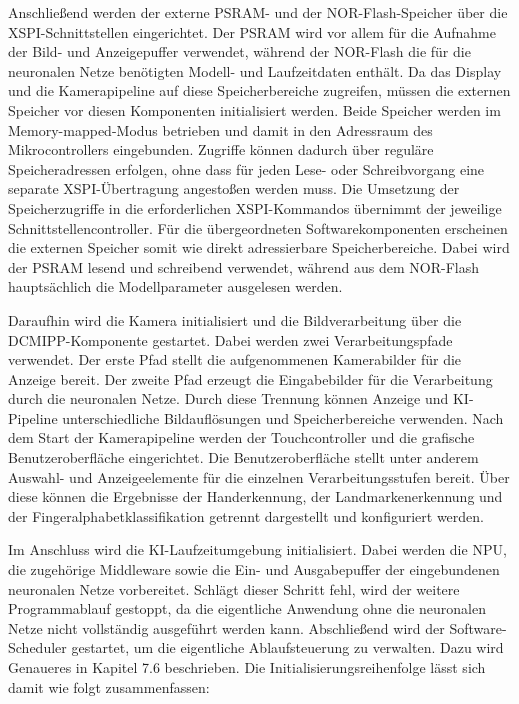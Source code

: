 Anschließend werden der externe PSRAM- und der NOR-Flash-Speicher über die XSPI-Schnittstellen eingerichtet. Der PSRAM wird vor allem für die Aufnahme der Bild- und Anzeigepuffer verwendet, während der NOR-Flash die für die neuronalen Netze benötigten Modell- und Laufzeitdaten enthält. Da das Display und die Kamerapipeline auf diese Speicherbereiche zugreifen, müssen die externen Speicher vor diesen Komponenten initialisiert werden. Beide Speicher werden im Memory-mapped-Modus betrieben und damit in den Adressraum des Mikrocontrollers eingebunden. Zugriffe können dadurch über reguläre Speicheradressen erfolgen, ohne dass für jeden Lese- oder Schreibvorgang eine separate XSPI-Übertragung angestoßen werden muss. Die Umsetzung der Speicherzugriffe in die erforderlichen XSPI-Kommandos übernimmt der jeweilige Schnittstellencontroller. Für die übergeordneten Softwarekomponenten erscheinen die externen Speicher somit wie direkt adressierbare Speicherbereiche. Dabei wird der PSRAM lesend und schreibend verwendet, während aus dem NOR-Flash hauptsächlich die Modellparameter ausgelesen werden.

Daraufhin wird die Kamera initialisiert und die Bildverarbeitung über die DCMIPP-Komponente gestartet. Dabei werden zwei Verarbeitungspfade verwendet. Der erste Pfad stellt die aufgenommenen Kamerabilder für die Anzeige bereit. Der zweite Pfad erzeugt die Eingabebilder für die Verarbeitung durch die neuronalen Netze. Durch diese Trennung können Anzeige und KI-Pipeline unterschiedliche Bildauflösungen und Speicherbereiche verwenden. Nach dem Start der Kamerapipeline werden der Touchcontroller und die grafische Benutzeroberfläche eingerichtet. Die Benutzeroberfläche stellt unter anderem Auswahl- und Anzeigeelemente für die einzelnen Verarbeitungsstufen bereit. Über diese können die Ergebnisse der Handerkennung, der Landmarkenerkennung und der Fingeralphabetklassifikation getrennt dargestellt und konfiguriert werden.

Im Anschluss wird die KI-Laufzeitumgebung initialisiert. Dabei werden die NPU, die zugehörige Middleware sowie die Ein- und Ausgabepuffer der eingebundenen neuronalen Netze vorbereitet. Schlägt dieser Schritt fehl, wird der weitere Programmablauf gestoppt, da die eigentliche Anwendung ohne die neuronalen Netze nicht vollständig ausgeführt werden kann. Abschließend wird der Software-Scheduler gestartet, um die eigentliche Ablaufsteuerung zu verwalten. Dazu wird Genaueres in Kapitel 7.6 beschrieben. Die Initialisierungsreihenfolge lässt sich damit wie folgt zusammenfassen:

